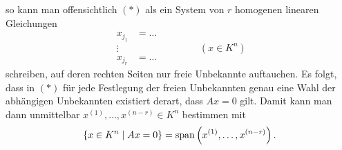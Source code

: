 \documentclass[../../main.tex]{subfiles}
\begin{document}
\begin{sprbem}
\begin{center}
\end{center}
\vspace{-5em}
so kann man offensichtlich $(*)$ als ein System von $r$ homogenen linearen Gleichungen
\[
\begin{split}
x_{j_1}&=\dots\\
\vdots\\
x_{j_r}&=\dots
\end{split}\qquad\qquad(x\in K^n)
\]
schreiben, auf deren rechten Seiten nur freie Unbekannte auftauchen. Es folgt, dass in $(*)$ für jede Festlegung der freien Unbekannten genau eine Wahl der abhängigen Unbekannten existiert derart, dass $Ax = 0$ gilt.
Damit kann man dann unmittelbar $x^{(1)},\ldots,x^{(n-r)}\in K^n$ bestimmen mit
$$\left\{x\in K^n\mid Ax=0\right\} = \operatorname{span}\left(x^{(1)},\ldots,x^{(n-r)}\right).$$
\end{sprbem}
\end{document}
